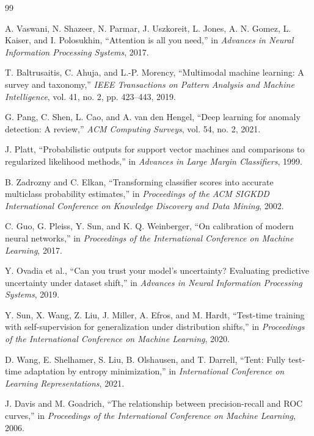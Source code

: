 \documentclass[11pt]{article}
\begin{document}
\begin{thebibliography}{99}

A. Vaswani, N. Shazeer, N. Parmar, J. Uszkoreit, L. Jones, A. N. Gomez,
L. Kaiser, and I. Polosukhin, ``Attention is all you need,'' in
\emph{Advances in Neural Information Processing Systems}, 2017.

T. Baltrusaitis, C. Ahuja, and L.-P. Morency, ``Multimodal machine learning:
A survey and taxonomy,'' \emph{IEEE Transactions on Pattern Analysis and Machine
Intelligence}, vol. 41, no. 2, pp. 423--443, 2019.

G. Pang, C. Shen, L. Cao, and A. van den Hengel, ``Deep learning for anomaly
detection: A review,'' \emph{ACM Computing Surveys}, vol. 54, no. 2, 2021.

J. Platt, ``Probabilistic outputs for support vector machines and comparisons
to regularized likelihood methods,'' in \emph{Advances in Large Margin
Classifiers}, 1999.

B. Zadrozny and C. Elkan, ``Transforming classifier scores into accurate
multiclass probability estimates,'' in \emph{Proceedings of the ACM SIGKDD
International Conference on Knowledge Discovery and Data Mining}, 2002.

C. Guo, G. Pleiss, Y. Sun, and K. Q. Weinberger, ``On calibration of modern
neural networks,'' in \emph{Proceedings of the International Conference on
Machine Learning}, 2017.

Y. Ovadia et al., ``Can you trust your model's uncertainty? Evaluating
predictive uncertainty under dataset shift,'' in \emph{Advances in Neural
Information Processing Systems}, 2019.

Y. Sun, X. Wang, Z. Liu, J. Miller, A. Efros, and M. Hardt, ``Test-time
training with self-supervision for generalization under distribution shifts,''
in \emph{Proceedings of the International Conference on Machine Learning}, 2020.

D. Wang, E. Shelhamer, S. Liu, B. Olshausen, and T. Darrell, ``Tent: Fully
test-time adaptation by entropy minimization,'' in \emph{International
Conference on Learning Representations}, 2021.

J. Davis and M. Goadrich, ``The relationship between precision-recall and ROC
curves,'' in \emph{Proceedings of the International Conference on Machine
Learning}, 2006.


\end{thebibliography}
\end{document}

